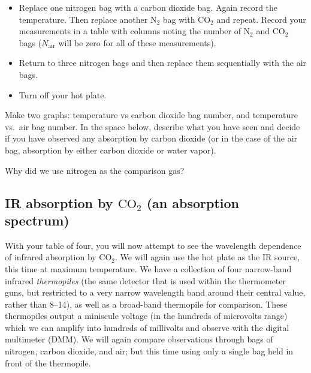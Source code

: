 \begin{itemize}
	\item Replace one nitrogen bag with a carbon dioxide bag.  Again record the temperature.  Then replace another $\text{N}_2$ bag with $\text{CO}_2$ and repeat. Record your measurements in a table with columns noting the number of $\text{N}_2$ and $\text{CO}_2$ bags ($N_\text{air}$ will be zero for all of these measurements).
	\item Return to three nitrogen bags and then replace them sequentially with the air bags.
	\item Turn off your hot plate.
	\end{itemize}
	

   Make two graphs:  temperature vs carbon dioxide bag number, and temperature vs.\ air bag number. In the space below, describe what you have seen and decide if you have observed any absorption by carbon dioxide (or in the case of the air bag, absorption by either carbon dioxide or water vapor).

\answerspace[8cm]

\noindent Why did we use nitrogen as the comparison gas?

\answerspace



\subsection{IR absorption by $\text{CO}_2$  (an absorption spectrum)}

With your table of four, you will now attempt to see the wavelength dependence of infrared absorption by $\text{CO}_2$. We will again use the hot plate as the IR source, this time at maximum temperature.  We have a collection of four narrow-band infrared {\em thermopiles} (the same detector that is used within the thermometer guns, but restricted to a very narrow wavelength band around their central value, rather than $8$--\unit{14}{\micro\meter}), as well as a broad-band thermopile for comparison. These thermopiles output a miniscule voltage (in the hundreds of microvolts range) which we can amplify into hundreds of millivolts and observe with the digital multimeter (DMM).  We will again compare observations through bags of nitrogen, carbon dioxide, and air; but this time using only a single bag held in front of the thermopile. \\[-6pt]

